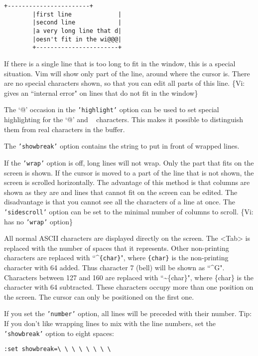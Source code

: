 \begin{Verbatim}[samepage=true]
		+-----------------------+
		|first line             |
		|second line            |
		|a very long line that d|
		|oesn't fit in the wi@@@|
		+-----------------------+
\end{Verbatim}

If there is a single line that is too long to fit in the window, this is a special situation.
Vim will show only part of the line, around where the cursor is.
There are no special characters shown, so that you can edit all parts of this line.
\{Vi: gives an ``internal error" on lines that do not fit in the window\}

The `@' occasion in the \texttt{'highlight'} option can be used to set special highlighting for the `@' and \texttt{~} characters.
This makes it possible to distinguish them from real characters in the buffer.

The \texttt{'showbreak'} option contains the string to put in front of wrapped lines.

\label{wrap-off}
If the \texttt{'wrap'} option is off, long lines will not wrap.
Only the part that fits on the screen is shown.
If the cursor is moved to a part of the line that is not shown, the screen is scrolled horizontally.
The advantage of this method is that columns are shown as they are and lines that cannot fit on the screen can be edited.
The disadvantage is that you cannot see all the characters of a line at once.
The \texttt{'sidescroll'} option can be set to the minimal number of columns to scroll.
\{Vi: has no \texttt{'wrap'} option\}

All normal ASCII characters are displayed directly on the screen.
The <Tab> is replaced with the number of spaces that it represents.
Other non-printing characters are replaced with ``\textasciicircum \texttt{\{char\}}", where \texttt{\{char\}} is the non-printing character with 64 added.
Thus character 7 (bell) will be shown as ``\textasciicircum G".
Characters between 127 and 160 are replaced with ``\textasciitilde \{char\}", where \{char\} is the character with 64 subtracted.
These characters occupy more than one position on the screen.
The cursor can only be positioned on the first one.

 If you set the \texttt{'number'} option, all lines will be preceded with their
 number.  Tip: If you don't like wrapping lines to mix with the line numbers,
 set the \texttt{'showbreak'} option to eight spaces:
\begin{Verbatim}[samepage=true]
		:set showbreak=\ \ \ \ \ \ \ \ 
\end{Verbatim}

